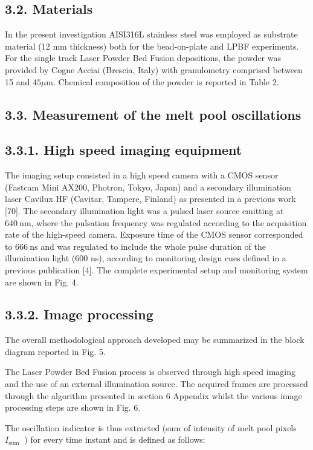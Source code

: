 \documentclass[10pt]{article}
\begin{document}
\subsection*{3.2. Materials}
In the present investigation AISI316L stainless steel was employed as substrate material (12 $\mathrm{mm}$ thickness) both for the bead-on-plate and LPBF experiments. For the single track Laser Powder Bed Fusion depositions, the powder was provided by Cogne Acciai (Brescia, Italy) with granulometry comprised between 15 and $45 \mu \mathrm{m}$. Chemical composition of the powder is reported in Table 2.

\subsection*{3.3. Measurement of the melt pool oscillations}
\subsection*{3.3.1. High speed imaging equipment}
The imaging setup consisted in a high speed camera with a CMOS sensor (Fastcam Mini AX200, Photron, Tokyo, Japan) and a secondary illumination laser Cavilux HF (Cavitar, Tampere, Finland) as presented in a previous work [70]. The secondary illumination light was a pulsed laser source emitting at $640 \mathrm{~nm}$, where the pulsation frequency was regulated according to the acquisition rate of the high-speed camera. Exposure time of the CMOS sensor corresponded to $666 \mathrm{~ns}$ and was regulated to include the whole pulse duration of the illumination light (600 ns), according to monitoring design cues defined in a previous publication [4]. The complete experimental setup and monitoring system are shown in Fig. 4.

\subsection*{3.3.2. Image processing}
The overall methodological approach developed may be summarized in the block diagram reported in Fig. 5.

The Laser Powder Bed Fusion process is observed through high speed imaging and the use of an external illumination source. The acquired frames are processed through the algorithm presented in section 6 Appendix whilst the various image processing steps are shown in Fig. 6.

The oscillation indicator is thus extracted (sum of intensity of melt pool pixels $I_{\text {sum }}$ ) for every time instant and is defined as follows:
\end{document}
